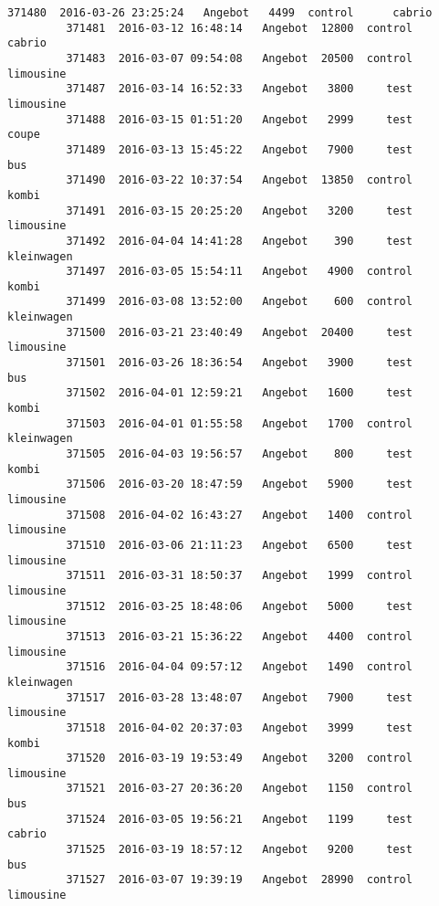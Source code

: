 \documentclass[11pt]{article}
\begin{document}
\begin{Verbatim}[commandchars=\\\{\}]
         371480  2016-03-26 23:25:24   Angebot   4499  control      cabrio   
         371481  2016-03-12 16:48:14   Angebot  12800  control      cabrio   
         371483  2016-03-07 09:54:08   Angebot  20500  control   limousine   
         371487  2016-03-14 16:52:33   Angebot   3800     test   limousine   
         371488  2016-03-15 01:51:20   Angebot   2999     test       coupe   
         371489  2016-03-13 15:45:22   Angebot   7900     test         bus   
         371490  2016-03-22 10:37:54   Angebot  13850  control       kombi   
         371491  2016-03-15 20:25:20   Angebot   3200     test   limousine   
         371492  2016-04-04 14:41:28   Angebot    390     test  kleinwagen   
         371497  2016-03-05 15:54:11   Angebot   4900  control       kombi   
         371499  2016-03-08 13:52:00   Angebot    600  control  kleinwagen   
         371500  2016-03-21 23:40:49   Angebot  20400     test   limousine   
         371501  2016-03-26 18:36:54   Angebot   3900     test         bus   
         371502  2016-04-01 12:59:21   Angebot   1600     test       kombi   
         371503  2016-04-01 01:55:58   Angebot   1700  control  kleinwagen   
         371505  2016-04-03 19:56:57   Angebot    800     test       kombi   
         371506  2016-03-20 18:47:59   Angebot   5900     test   limousine   
         371508  2016-04-02 16:43:27   Angebot   1400  control   limousine   
         371510  2016-03-06 21:11:23   Angebot   6500     test   limousine   
         371511  2016-03-31 18:50:37   Angebot   1999  control   limousine   
         371512  2016-03-25 18:48:06   Angebot   5000     test   limousine   
         371513  2016-03-21 15:36:22   Angebot   4400  control   limousine   
         371516  2016-04-04 09:57:12   Angebot   1490  control  kleinwagen   
         371517  2016-03-28 13:48:07   Angebot   7900     test   limousine   
         371518  2016-04-02 20:37:03   Angebot   3999     test       kombi   
         371520  2016-03-19 19:53:49   Angebot   3200  control   limousine   
         371521  2016-03-27 20:36:20   Angebot   1150  control         bus   
         371524  2016-03-05 19:56:21   Angebot   1199     test      cabrio   
         371525  2016-03-19 18:57:12   Angebot   9200     test         bus   
         371527  2016-03-07 19:39:19   Angebot  28990  control   limousine   
         

\end{Verbatim}
\end{document}
